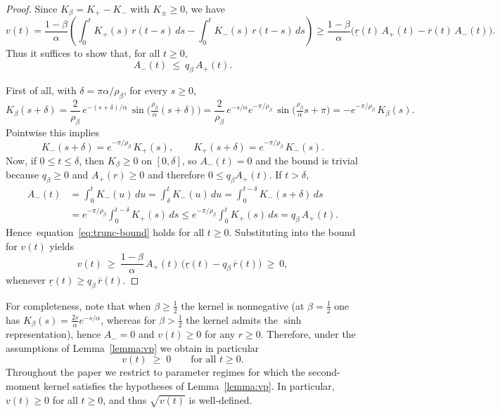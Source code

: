 \documentclass{article} %
\def\eqref#1{equation~\ref{#1}}
\begin{document}
\begin{proof}
Since \(K_\beta=K_+-K_-\) with \(K_\pm\ge 0\), we have
\[
v(t)=\frac{1-\beta}{\alpha}\!\left(\int_0^t K_+(s)\,r(t-s)\,ds-\int_0^t K_-(s)\,r(t-s)\,ds\right)
\ge \frac{1-\beta}{\alpha}\big(\underline r(t)\,A_+(t)-\overline r(t)\,A_-(t)\big).
\]
Thus it suffices to show that, for all \(t\ge 0\),
\begin{equation}\label{eq:trunc-bound}
A_-(t)\ \le\ q_\beta\,A_+(t).
\end{equation}

First of all, with \(\delta=\pi\alpha/\rho_\beta\), for every \(s\ge 0\),
\[
K_\beta(s+\delta)
=\frac{2}{\rho_\beta}\,e^{-(s+\delta)/\alpha}\,\sin\!\Big(\tfrac{\rho_\beta}{\alpha}(s+\delta)\Big)
=\frac{2}{\rho_\beta}\,e^{-s/\alpha}e^{-\pi/\rho_\beta}\,\sin\!\Big(\tfrac{\rho_\beta}{\alpha}s+\pi\Big)
=-e^{-\pi/\rho_\beta}\,K_\beta(s).
\]
Pointwise this implies
\[
K_-(s+\delta)=e^{-\pi/\rho_\beta}\,K_+(s),\qquad K_+(s+\delta)=e^{-\pi/\rho_\beta}\,K_-(s).
\]
Now, if \(0\le t\le \delta\), then \(K_\beta\ge 0\) on \([0,\delta]\), so \(A_-(t)=0\) and the bound is trivial because $q_\beta \geq 0$ and $A_+(r)\geq 0$ and therefore $0 \leq q_\beta A_+(t)$. If \(t>\delta\),
\[
\begin{aligned}
A_-(t)&=\int_0^t K_-(u)\,du=\int_\delta^t K_-(u)\,du
=\int_0^{t-\delta} K_-(s+\delta)\,ds\\
&=e^{-\pi/\rho_\beta}\int_0^{t-\delta} K_+(s)\,ds
\le e^{-\pi/\rho_\beta}\int_0^{t} K_+(s)\,ds
= q_\beta\,A_+(t).  
\end{aligned}
\]
Hence~\eqref{eq:trunc-bound} holds for all \(t\ge 0\). Substituting into the bound for \(v(t)\) yields
\[
v(t)\ \ge\ \frac{1-\beta}{\alpha}\,A_+(t)\,\big(\underline r(t)-q_\beta\,\overline r(t)\big)\ \ge\ 0,
\]
whenever \(\underline r(t)\ge q_\beta\,\overline r(t)\).
\end{proof}

For completeness, note that when $\beta\ge \tfrac12$ the kernel is nonnegative (at $\beta=\tfrac12$ one has $K_\beta(s)=\tfrac{2s}{\alpha}e^{-s/\alpha}$, whereas for $\beta>\tfrac12$ the kernel admits the $\sinh$ representation), hence $A_-=0$ and $v(t)\ge 0$ for any $r\ge 0$. Therefore, under the assumptions of Lemma~\ref{lemma:vp} we obtain in particular
\[
v(t)\;\ge\;0\qquad\text{for all }t\ge 0.
\]
Throughout the paper we restrict to parameter regimes for which the second-moment kernel satisfies the hypotheses of Lemma~\ref{lemma:vp}. In particular, $v(t)\ge 0$ for all $t\ge 0$, and thus $\sqrt{v(t)}$ is well-defined.
\end{document}
